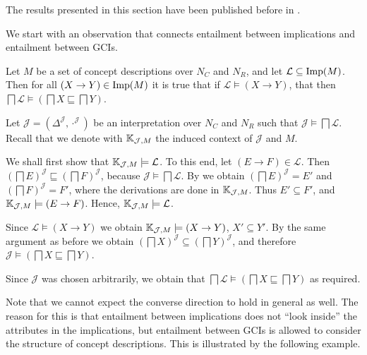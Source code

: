 The results presented in this section have been published before in
\cite{Borchmann-LTCS-12-06}.

We start with an observation that connects entailment between implications and entailment
between GCIs.

\begin{Lemma}
  \label{lem:implicational-entailment-implies-gci-entailment}
  Let $M$ be a set of concept descriptions over $N_C$ and $N_R$, and let $\mathcal{L}
  \subseteq \operatorname{Imp}(M)$.  Then for all $(X \to Y) \in \operatorname{Imp}(M)$ it is true that if
  $\mathcal{L} \models (X \to Y)$, that then $\bigsqcap \mathcal{L} \models (\bigsqcap X
  \sqsubseteq \bigsqcap Y)$.
\end{Lemma}
\begin{Proof}
  Let $\mathcal{J} = (\Delta^{\mathcal{J}}, \cdot^{\mathcal{J}})$ be an interpretation
  over $N_C$ and $N_R$ such that $\mathcal{J} \models \bigsqcap \mathcal{L}$.  Recall that
  we denote with ${\mathbb{K}}_{\mathcal{J}, M}$ the induced context of $\mathcal{J}$ and $M$.
  
  We shall first show that ${\mathbb{K}}_{\mathcal{J}, M} \models \mathcal{L}$.  To this end,
  let $(E \to F) \in \mathcal{L}$.  Then $(\bigsqcap E)^{\mathcal{J}} \sqsubseteq
  (\bigsqcap F)^{\mathcal{J}}$, because $\mathcal{J} \models \bigsqcap \mathcal{L}$.  By
   we obtain $(\bigsqcap E)^{\mathcal{J}} = E'$ and
  $(\bigsqcap F)^{\mathcal{J}} = F'$, where the derivations are done in ${\mathbb{K}}_{\mathcal{J}, M}$.  Thus $E' \subseteq F'$, and ${\mathbb{K}}_{\mathcal{J}, M} \models (E
  \to F)$.  Hence, ${\mathbb{K}}_{\mathcal{J}, M} \models \mathcal{L}$.

  Since $\mathcal{L} \models (X \to Y)$ we obtain ${\mathbb{K}}_{\mathcal{J}, M} \models (X \to
  Y)$, \ie $X' \subseteq Y'$.  By the same argument as before we obtain $(\bigsqcap
  X)^{\mathcal{J}} \subseteq (\bigsqcap Y)^{\mathcal{J}}$, and therefore $\mathcal{J}
  \models (\bigsqcap X \sqsubseteq \bigsqcap Y)$.

  Since $\mathcal{J}$ was chosen arbitrarily, we obtain that $\bigsqcap \mathcal{L}
  \models (\bigsqcap X \sqsubseteq \bigsqcap Y)$ as required.
\end{Proof}

Note that we cannot expect the converse direction to hold in general as well.  The reason
for this is that entailment between implications does not ``look inside'' the attributes
in the implications, but entailment between GCIs is allowed to consider the structure of
concept descriptions.  This is illustrated by the following example.

